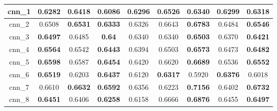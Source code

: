 \begin{table}[p]
\begin{tabular}{|c|c|c|c|c|c|c|c|c|}
        cnn\_1   & 0.6282                              & \textbf{0.6418}                     & 0.6086                              & \textbf{0.6296}                     & \textbf{0.6526}                     & 0.6340                              & 0.6299                              & \textbf{0.6318}                     \\ \hline
        cnn\_2   & 0.6508                              & \textbf{0.6531}                     & \textbf{0.6333}                     & 0.6326                              & 0.6643                              & \textbf{0.6783}                     & 0.6484                              & \textbf{0.6546}                     \\ \hline
        cnn\_3   & \textbf{0.6497}                     & 0.6485                              & \textbf{0.64}                       & 0.6340                              & 0.6340                              & \textbf{0.6503}                     & 0.6370                              & \textbf{0.6421}                     \\ \hline
        cnn\_4   & \textbf{0.6564}                     & 0.6542                              & \textbf{0.6443}                     & 0.6394                              & 0.6503                              & \textbf{0.6573}                     & 0.6473                              & \textbf{0.6482}                     \\ \hline
        cnn\_5   & \textbf{0.6598}                     & 0.6587                              & \textbf{0.6454}                     & 0.6420                              & 0.6620                              & \textbf{0.6689}                     & 0.6536                              & \textbf{0.6552}                     \\ \hline
        cnn\_6   & \textbf{0.6519}                     & 0.6203                              & \textbf{0.6437}                     & 0.6120                              & \textbf{0.6317}                     & 0.5920                              & \textbf{0.6376}                     & 0.6018                              \\ \hline
        cnn\_7   & 0.6610                              & \textbf{0.6632}                     & \textbf{0.6592}                     & 0.6356                              & 0.6223                              & \textbf{0.7156}                     & 0.6402                              & \textbf{0.6732}                     \\ \hline
        cnn\_8   & \textbf{0.6451}                     & 0.6406                              & \textbf{0.6258}                     & 0.6158                              & 0.6666                              & \textbf{0.6876}                     & 0.6455                              & \textbf{0.6497}                     \\ \hline

\end{tabular}
\end{table}
